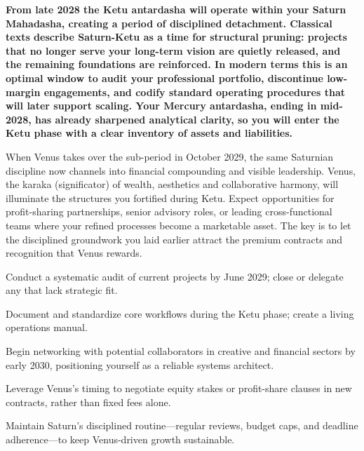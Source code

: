 \label{topic56}

{\fontsize{9.5}{13.8}\selectfont\bfseries\color{DeepSlate} From late 2028 the Ketu antardasha will operate within your Saturn Mahadasha, creating a period of disciplined detachment. Classical texts describe Saturn-Ketu as a time for structural pruning: projects that no longer serve your long-term vision are quietly released, and the remaining foundations are reinforced. In modern terms this is an optimal window to audit your professional portfolio, discontinue low-margin engagements, and codify standard operating procedures that will later support scaling. Your Mercury antardasha, ending in mid-2028, has already sharpened analytical clarity, so you will enter the Ketu phase with a clear inventory of assets and liabilities.}\par\vspace{2mm}

{\fontsize{9}{13}\selectfont When Venus takes over the sub-period in October 2029, the same Saturnian discipline now channels into financial compounding and visible leadership. Venus, the karaka (significator) of wealth, aesthetics and collaborative harmony, will illuminate the structures you fortified during Ketu. Expect opportunities for profit-sharing partnerships, senior advisory roles, or leading cross-functional teams where your refined processes become a marketable asset. The key is to let the disciplined groundwork you laid earlier attract the premium contracts and recognition that Venus rewards.}\par\vspace{1.8mm}

\begin{diamondlist}
  \item {\fontsize{8.5}{12}\selectfont Conduct a systematic audit of current projects by June 2029; close or delegate any that lack strategic fit.}
  \item {\fontsize{8.5}{12}\selectfont Document and standardize core workflows during the Ketu phase; create a living operations manual.}
  \item {\fontsize{8.5}{12}\selectfont Begin networking with potential collaborators in creative and financial sectors by early 2030, positioning yourself as a reliable systems architect.}
  \item {\fontsize{8.5}{12}\selectfont Leverage Venus's timing to negotiate equity stakes or profit-share clauses in new contracts, rather than fixed fees alone.}
  \item {\fontsize{8.5}{12}\selectfont Maintain Saturn's disciplined routine---regular reviews, budget caps, and deadline adherence---to keep Venus-driven growth sustainable.}
\end{diamondlist}

